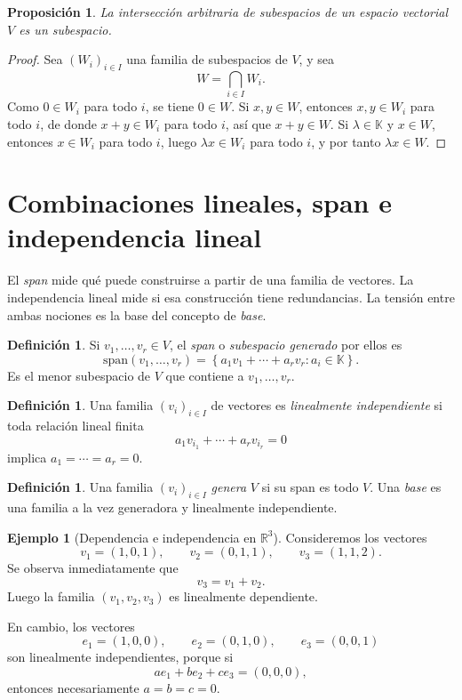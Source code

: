 \documentclass[10pt,a4paper,oneside]{article}
\theoremstyle{plain}
\newtheorem{proposition}[theorem]{Proposición}
\theoremstyle{definition}
\newtheorem{definition}[theorem]{Definición}
\newtheorem{example}[theorem]{Ejemplo}
\theoremstyle{remark}
\newcommand{\K}{\mathbb{K}}
\newcommand{\R}{\mathbb{R}}
\newcommand{\Span}{\mathrm{span}}
\newcommand{\set}[1]{\left\{ #1 \right\}}
\begin{document}
\begin{proposition}
La intersección arbitraria de subespacios de un espacio vectorial \(V\) es un subespacio.
\end{proposition}

\begin{proof}
Sea \((W_i)_{i\in I}\) una familia de subespacios de \(V\), y sea
\[
W=\bigcap_{i\in I} W_i.
\]
Como \(0\in W_i\) para todo \(i\), se tiene \(0\in W\). Si \(x,y\in W\), entonces \(x,y\in W_i\) para todo \(i\), de donde \(x+y\in W_i\) para todo \(i\), así que \(x+y\in W\). Si \(\lambda\in\K\) y \(x\in W\), entonces \(x\in W_i\) para todo \(i\), luego \(\lambda x\in W_i\) para todo \(i\), y por tanto \(\lambda x\in W\). \end{proof}

\section{Combinaciones lineales, span e independencia lineal}
\begin{ideaBox}
El \emph{span} mide qué puede construirse a partir de una familia de vectores. La independencia lineal mide si esa construcción tiene redundancias. La tensión entre ambas nociones es la base del concepto de \emph{base}.
\end{ideaBox}
\begin{definition}
Si \(v_1,\dots,v_r\in V\), el \emph{span} o \emph{subespacio generado} por ellos es
\[
\Span(v_1,\dots,v_r)=\set{a_1v_1+\cdots+a_rv_r: a_i\in\K}.
\]
Es el menor subespacio de \(V\) que contiene a \(v_1,\dots,v_r\).
\end{definition}

\begin{definition}
Una familia \((v_i)_{i\in I}\) de vectores es \emph{linealmente independiente} si toda relación lineal finita
\[
a_1v_{i_1}+\cdots+a_rv_{i_r}=0
\]
implica \(a_1=\cdots=a_r=0\).
\end{definition}

\begin{definition}
Una familia \((v_i)_{i\in I}\) \emph{genera} \(V\) si su span es todo \(V\).
Una \emph{base} es una familia a la vez generadora y linealmente independiente.
\end{definition}

\begin{example}[Dependencia e independencia en \(\R^3\)]
Consideremos los vectores
\[
v_1=(1,0,1),\qquad v_2=(0,1,1),\qquad v_3=(1,1,2).
\]
Se observa inmediatamente que
\[
v_3=v_1+v_2.
\]
Luego la familia \((v_1,v_2,v_3)\) es linealmente dependiente.

En cambio, los vectores
\[
e_1=(1,0,0),\qquad e_2=(0,1,0),\qquad e_3=(0,0,1)
\]
son linealmente independientes, porque si
\[
ae_1+be_2+ce_3=(0,0,0),
\]
entonces necesariamente \(a=b=c=0\).
\end{example}
\end{document}
